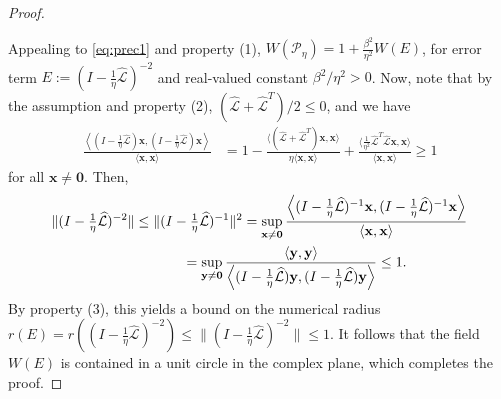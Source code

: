 \documentclass[review]{siamart}
\begin{document}
\begin{proof}
\begin{enumerate}
\end{enumerate}
%
Appealing to \eqref{eq:prec1} and property (1), $W(\mathcal{P}_\eta)
= 1 + \tfrac{\beta^2}{\eta^2}W(E)$, for error term
$E := (I - \tfrac{1}{\eta}\widehat{\mathcal{L}})^{-2}$
and real-valued constant $\beta^2/\eta^2 > 0$.
Now, note that by the assumption and property (2),
$(\widehat{\mathcal{L}}+\widehat{\mathcal{L}}^T)/2 \leq 0$, and we have
%
\begin{align}\label{eq:norm1}
\frac{\left\langle (I - \tfrac{1}{\eta}\widehat{\mathcal{L}})\mathbf{x},(I - \tfrac{1}{\eta}\widehat{\mathcal{L}})\mathbf{x}\right\rangle}
	{\langle\mathbf{x},\mathbf{x}\rangle}
& = 1 - \frac{\langle (\widehat{\mathcal{L}} + \widehat{\mathcal{L}}^T )
	\mathbf{x},\mathbf{x}\rangle}{\eta \langle\mathbf{x},\mathbf{x}\rangle} +
	\frac{\langle \tfrac{1}{\eta^2}\widehat{\mathcal{L}}^T\widehat{\mathcal{L}}\mathbf{x},
	\mathbf{x}\rangle}{\langle\mathbf{x},\mathbf{x}\rangle}
\geq 1
\end{align}
%
for all $\mathbf{x}\neq\mathbf{0}$. Then,
%
\begin{align*}
\|(I - \tfrac{1}{\eta}\widehat{\mathcal{L}})^{-2}\| \leq \|(I - \tfrac{1}{\eta}\widehat{\mathcal{L}})^{-1}\|^2
& = \sup_{\mathbf{x}\neq\mathbf{0}}
	\frac{\left\langle (I - \tfrac{1}{\eta}\widehat{\mathcal{L}})^{-1}\mathbf{x},
	(I - \tfrac{1}{\eta}\widehat{\mathcal{L}})^{-1}\mathbf{x}\right\rangle}
	{\langle\mathbf{x},\mathbf{x}\rangle} \\
&\hspace{-10ex}= \sup_{\mathbf{y}\neq\mathbf{0}}
	\frac{\langle\mathbf{y},\mathbf{y}\rangle}{\left\langle (I - \tfrac{1}{\eta}\widehat{\mathcal{L}})\mathbf{y},
	(I - \tfrac{1}{\eta}\widehat{\mathcal{L}})\mathbf{y}\right\rangle}
\leq 1.
\end{align*}
%
By property (3), this yields a bound on the numerical radius
$r(E) = r((I - \tfrac{1}{\eta}\widehat{\mathcal{L}})^{-2})
\leq \|(I - \tfrac{1}{\eta}\widehat{\mathcal{L}})^{-2}\|\leq 1$. It follows that
the field $W(E)$ is contained in a unit circle in the complex plane,
which completes the proof.
\end{proof}
%
\end{document}
